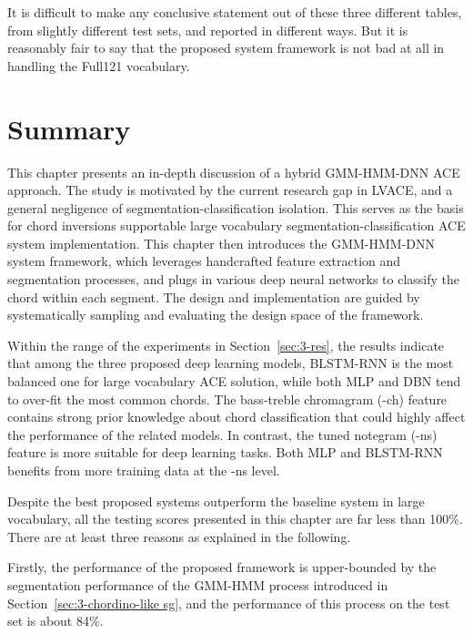 It is difficult to make any conclusive statement out of these three different tables, from slightly different test sets, and reported in different ways. But it is reasonably fair to say that the proposed system framework is not bad at all in handling the Full121 vocabulary.


\section{Summary} \label{sec:3-concln}
This chapter presents an in-depth discussion of a hybrid GMM-HMM-DNN ACE approach. The study is motivated by the current research gap in LVACE, and a general negligence of segmentation-classification isolation. This serves as the basis for chord inversions supportable large vocabulary segmentation-classification ACE system implementation. This chapter then introduces the GMM-HMM-DNN system framework, which leverages handcrafted feature extraction and segmentation processes, and plugs in various deep neural networks to classify the chord within each segment. The design and implementation are guided by systematically sampling and evaluating the design space of the framework.

Within the range of the experiments in Section~\ref{sec:3-res}, the results indicate that among the three proposed deep learning models, BLSTM-RNN is the most balanced one for large vocabulary ACE solution, while both MLP and DBN tend to over-fit the most common chords. The bass-treble chromagram (-ch) feature contains strong prior knowledge about chord classification that could highly affect the performance of the related models. In contrast, the tuned notegram (-ns) feature is more suitable for deep learning tasks. Both MLP and BLSTM-RNN benefits from more training data at the -ns level.

Despite the best proposed systems outperform the baseline system in large vocabulary, all the testing scores presented in this chapter are far less than 100\%. There are at least three reasons as explained in the following.



Firstly, the performance of the proposed framework is upper-bounded by the segmentation performance of the GMM-HMM process introduced in Section~\ref{sec:3-chordino-like sg}, and the performance of this process on the test set is about 84\%.

